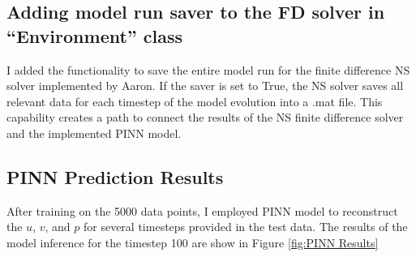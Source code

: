 \subsection{Adding model run saver to the FD solver in ``Environment'' class}
I added the functionality to save the entire model run for the finite difference NS solver implemented by Aaron. If the saver is set to True, the NS solver saves all relevant data for each timestep of the model evolution into a .mat file. This capability creates a path to connect the results of the NS finite difference solver and the implemented PINN model.

\subsection{PINN Prediction Results}
After training on the 5000 data points, I employed PINN model to reconstruct the $u$, $v$, and $p$ for several timesteps provided in the test data. The results of the model inference for the timestep 100 are show in Figure \ref{fig:PINN Results}

